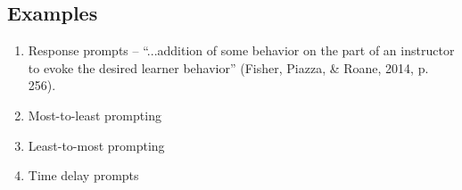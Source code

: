 \subsection{Examples}
\begin{enumerate}
\item Response prompts – ``...addition of some behavior on the part of an instructor to evoke the desired learner behavior'' (Fisher, Piazza, \& Roane, 2014, p. 256).
\item Most-to-least prompting
\item Least-to-most prompting
\item Time delay prompts
\end{enumerate}
%

